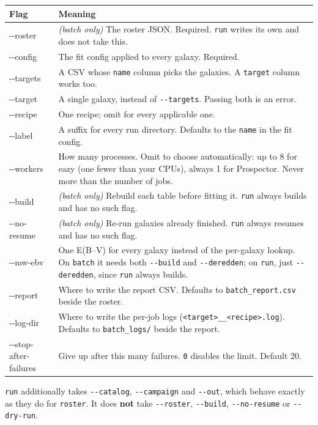 \documentclass[11pt]{article}
\begin{document}
\begin{longtable}{>{\ttfamily}l p{9.4cm}}
\toprule
\textbf{\normalfont Flag} & \textbf{Meaning} \\
\midrule
\endhead
-{}-roster & \emph{(batch only)} The roster JSON. Required.
  \texttt{run} writes its own and does not take this. \\
-{}-config & The fit config applied to every galaxy. Required. \\
-{}-targets & A CSV whose \texttt{name} column picks the galaxies. A
  \texttt{target} column works too. \\
-{}-target & A single galaxy, instead of \texttt{-{}-targets}. Passing
  both is an error. \\
-{}-recipe & One recipe; omit for every applicable one. \\
-{}-label & A suffix for every run directory. Defaults to the
  \texttt{name} in the fit config. \\
-{}-workers & How many processes. Omit to choose automatically: up to 8
  for eazy (one fewer than your CPUs), always 1 for Prospector. Never
  more than the number of jobs. \\
-{}-build & \emph{(batch only)} Rebuild each table before fitting it.
  \texttt{run} always builds and has no such flag. \\
-{}-no-resume & \emph{(batch only)} Re-run galaxies already finished.
  \texttt{run} always resumes and has no such flag. \\
-{}-mw-ebv & One E(B--V) for every galaxy instead of the per-galaxy
  lookup. On \texttt{batch} it needs both \texttt{-{}-build} and
  \texttt{-{}-deredden}; on \texttt{run}, just \texttt{-{}-deredden},
  since \texttt{run} always builds. \\
-{}-report & Where to write the report CSV. Defaults to
  \texttt{batch\_report.csv} beside the roster. \\
-{}-log-dir & Where to write the per-job logs
  (\texttt{<target>\_\_<recipe>.log}). Defaults to
  \texttt{batch\_logs/} beside the report. \\
-{}-stop-after-failures & Give up after this many failures.
  \texttt{0} disables the limit. Default 20. \\
\bottomrule
\end{longtable}

\texttt{run} additionally takes \texttt{-{}-catalog}, \texttt{-{}-campaign}
and \texttt{-{}-out}, which behave exactly as they do for
\texttt{roster}. It does \textbf{not} take \texttt{-{}-roster},
\texttt{-{}-build}, \texttt{-{}-no-resume} or \texttt{-{}-dry-run}.
\end{document}
